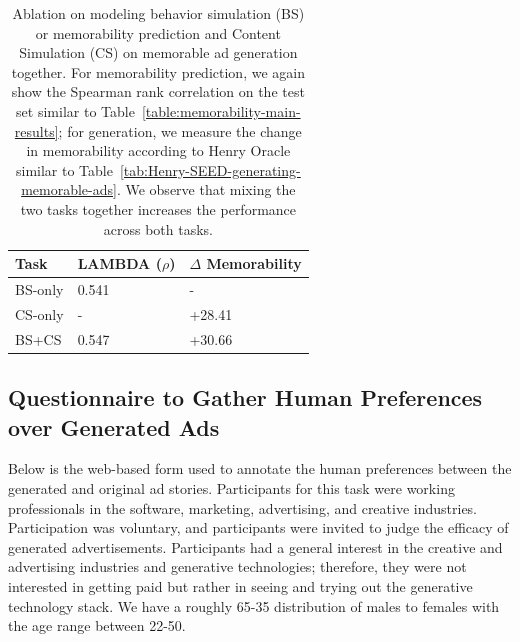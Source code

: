 \begin{table}
\centering
\begin{tabular}{l|l|l}
\hline
Task    & LAMBDA ($\rho$) & $\Delta$ Memorability \\\hline
BS-only & 0.541 & - \\
CS-only & - & +28.41 \\
BS+CS   & 0.547 & +30.66 \\\hline
\end{tabular}
\caption{Ablation on modeling behavior simulation (BS) or memorability prediction and Content Simulation (CS) on memorable ad generation together. For memorability prediction, we again show the Spearman rank correlation on the test set similar to Table~\ref{table:memorability-main-results}; for generation, we measure the change in memorability according to Henry Oracle similar to Table~\ref{tab:Henry-SEED-generating-memorable-ads}. We observe that mixing the two tasks together increases the performance across both tasks.}
\label{table:behaviour+content simulation}
\end{table}


\FloatBarrier
\subsection{Questionnaire to Gather Human Preferences over Generated Ads}
\label{sec:Questionnaire to Gather Human Preferences over Generated Ads}
Below is the web-based form used to annotate the human preferences between the generated and original ad stories. Participants for this task were working professionals in the software, marketing, advertising, and creative industries. Participation was voluntary, and participants were invited to judge the efficacy of generated advertisements. Participants had a general interest in the creative and advertising industries and generative technologies; therefore, they were not interested in getting paid but rather in seeing and trying out the generative technology stack. We have a roughly 65-35 distribution of males to females with the age range between 22-50.

